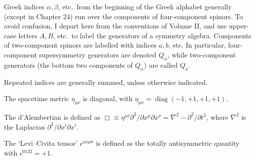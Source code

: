 Greek indices \(\alpha,\beta\), etc.\ from the beginning of the Greek alphabet
generally (except in Chapter 24) run over the components of four-component
spinors. To avoid confusion, I depart here from the conventions of Volume II,
and use upper-case letters \(A,B\), etc.\ to label the generators of a
symmetry algebra. Components of two-component spinors are labelled with
indices \(a,b\), etc. In particular, four-component supersymmetry generators
are denoted \(Q_\alpha\), while two-component generators (the bottom two
components of \(Q_\alpha\)) are called \(Q_a\).

Repeated indices are generally summed, unless otherwise indicated.

The spacetime metric \(\eta_{\mu\nu}\) is diagonal, with
\(\eta_{\mu\nu}=\operatorname{diag}(-1,+1,+1,+1)\).

The d'Alembertian is defined as
\(\Box\equiv\eta^{\mu\nu}\partial^2/\partial x^\mu\partial x^\nu
=\nabla^2-\partial^2/\partial t^2\), where \(\nabla^2\) is the Laplacian
\(\partial^2/\partial x^i\partial x^i\).

The `Levi--Civita tensor' \(\epsilon^{\mu\nu\rho\sigma}\) is defined as the
totally antisymmetric quantity with \(\epsilon^{0123}=+1\).

